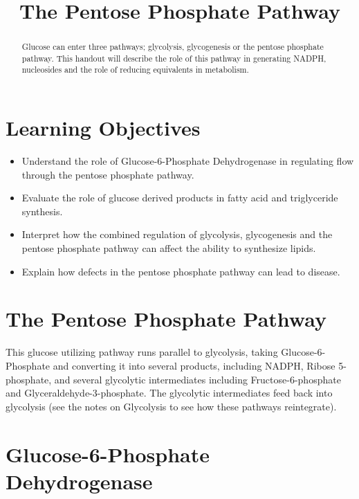 \documentclass{tufte-handout}
\title{The Pentose Phosphate Pathway}
\author{}
\date{}  %
\begin{document}
\maketitle%

\begin{abstract}
\noindent Glucose can enter three pathways; glycolysis, glycogenesis or the pentose phosphate pathway.  This handout will describe the role of this pathway in generating NADPH, nucleosides and the role of reducing equivalents in metabolism.
\end{abstract}

\tableofcontents
\pagebreak
\section{Learning Objectives}

\begin{itemize}
\item Understand the role of Glucose-6-Phosphate Dehydrogenase in regulating flow through the pentose phosphate pathway.
\item Evaluate the role of glucose derived products in fatty acid and triglyceride synthesis.
\item Interpret how the combined regulation of glycolysis, glycogenesis and the pentose phosphate pathway can affect the ability to synthesize lipids.
\item Explain how defects in the pentose phosphate pathway can lead to disease.
\end{itemize}

\section{The Pentose Phosphate Pathway}

This glucose utilizing pathway runs parallel to glycolysis, taking Glucose-6-Phosphate and converting it into several products, including NADPH, Ribose 5-phosphate, and several glycolytic intermediates including Fructose-6-phosphate and Glyceraldehyde-3-phosphate.  The glycolytic intermediates feed back into glycolysis (see the notes on Glycolysis to see how these pathways reintegrate).

\section{Glucose-6-Phosphate Dehydrogenase}
\end{document}
